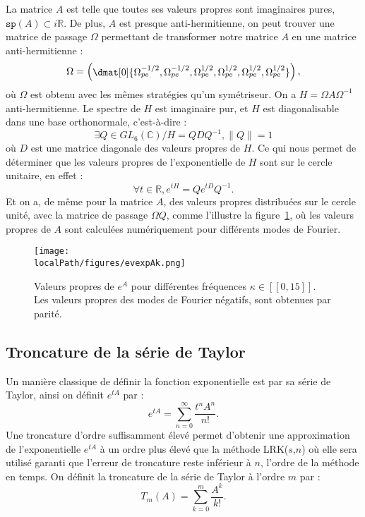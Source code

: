 La matrice $A$ est telle que toutes ses valeurs propres sont imaginaires pures, $\texttt{sp}(A)\subset i\mathbb{R}$. De plus, $A$ est presque anti-hermitienne, on peut trouver une matrice de passage $\Omega$ permettant de transformer notre matrice $A$ en une matrice anti-hermitienne :
$$
  \Omega = 
  \begin{pmatrix}
    \dmat[0]{\Omega_{pe}^{-1/2},\Omega_{pe}^{-1/2},\Omega_{pe}^{1/2},\Omega_{pe}^{1/2},\Omega_{pe}^{1/2},\Omega_{pe}^{1/2}}
  \end{pmatrix},
$$
où $\Omega$ est obtenu avec les mêmes stratégies qu'un symétriseur. On a $H=\Omega A \Omega^{-1}$ anti-hermitienne. Le spectre de $H$ est imaginaire pur, et $H$ est diagonalisable dans une base orthonormale, c'est-à-dire :
$$
  \exists Q \in GL_6(\mathbb{C}) / H = QDQ^{-1}, \|Q\|=1
$$
où $D$ est une matrice diagonale des valeurs propres de $H$. Ce qui nous permet de déterminer que les valeurs propres de l'exponentielle de $H$ sont sur le cercle unitaire, en effet :
$$
  \forall t\in\mathbb{R}, e^{tH} = Qe^{tD}Q^{-1}.
$$
Et on a, de même pour la matrice $A$, des valeurs propres distribuées sur le cercle unité, avec la matrice de passage $\Omega Q$, comme l'illustre la figure~\ref{fig:evexpAk}, où les valeurs propres de $A$ sont calculées numériquement pour différents modes de Fourier.

\begin{figure}
  \centering
  \texttt{[image: \\localPath/figures/evexpAk.png]}
  \caption{Valeurs propres de $e^{A}$ pour différentes fréquences $\kappa\in[\![0,15]\!]$. Les valeurs propres des modes de Fourier négatifs, sont obtenues par parité.}
  \label{fig:evexpAk}
\end{figure}

\subsection{Troncature de la série de Taylor}

Un manière classique de définir la fonction exponentielle est par sa série de Taylor, ainsi on définit $e^{tA}$ par :
$$
  e^{tA} = \sum_{n=0}^\infty \frac{t^nA^n}{n!}.
$$
Une troncature d'ordre suffisamment élevé permet d'obtenir une approximation de l'exponentielle $e^{tA}$ à un ordre plus élevé que la méthode LRK($s$,$n$) où elle sera utilisé garanti que l'erreur de troncature reste inférieur à $n$, l'ordre de la méthode en temps. On définit la troncature de la série de Taylor à l'ordre $m$ par :
$$
  T_m(A) = \sum_{k=0}^m \frac{A^k}{k!}.
$$


